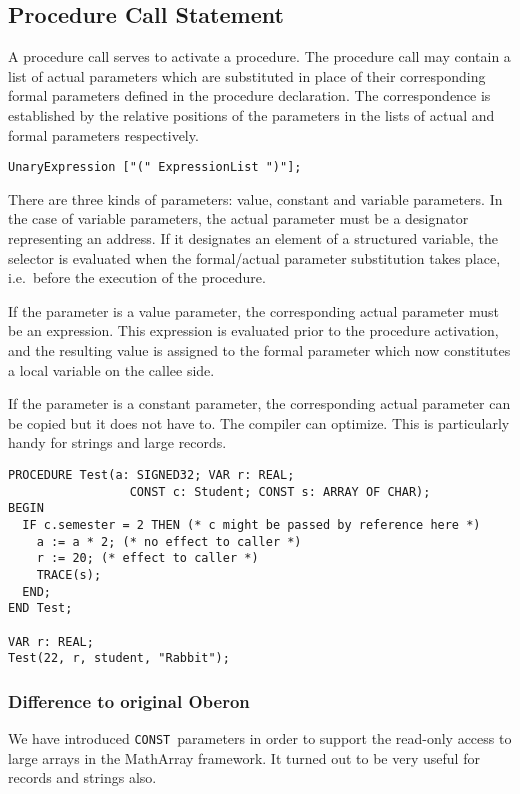 \documentclass[a4wide,11pt]{article}
\newcommand{\CONST}{\lstinline"CONST"}
\begin{document}
\subsection{Procedure Call Statement}
A procedure call serves to activate a procedure.
The procedure call may contain a list of actual parameters which are substituted in place of their corresponding formal parameters defined in the procedure declaration.
The correspondence is established by the relative positions of the parameters in the lists of actual and formal parameters respectively.

\begin{lstlisting}[style=ebnf]
	UnaryExpression ["(" ExpressionList ")"];
\end{lstlisting}

There are three kinds of parameters: value, constant and variable parameters.
In the case of variable parameters, the actual parameter must be a designator representing an address.
If it designates an element of a structured variable, the selector is evaluated when the formal/actual parameter substitution takes place, i.e.\ before the execution of the procedure.

If the parameter is a value parameter, the corresponding actual parameter must be an expression.
This expression is evaluated prior to the procedure activation, and the resulting value is assigned to the formal parameter which now constitutes a local variable on the callee side.

If the parameter is a constant parameter, the corresponding actual parameter can be copied but it does not have to.
The compiler can optimize.
This is particularly handy for strings and large records.

\begin{annotation}
\begin{lstlisting}[style=example]
PROCEDURE Test(a: SIGNED32; VAR r: REAL;
                 CONST c: Student; CONST s: ARRAY OF CHAR);
BEGIN
  IF c.semester = 2 THEN (* c might be passed by reference here *)
    a := a * 2; (* no effect to caller *)
    r := 20; (* effect to caller *)
    TRACE(s);
  END;
END Test;

VAR r: REAL;
Test(22, r, student, "Rabbit");
\end{lstlisting}

\subsubsection{Difference to original Oberon}
We have introduced \CONST\ parameters in order to support the read-only access to large arrays in the MathArray framework.
It turned out to be very useful for records and strings also.
\end{annotation}
\end{document}
